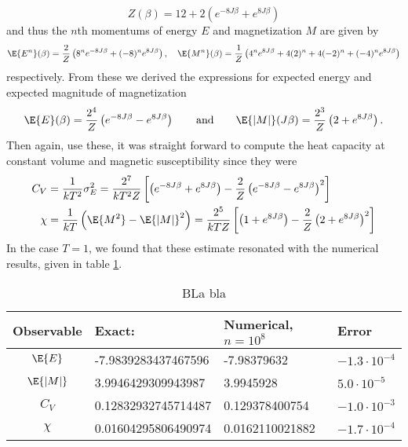 \documentclass[11pt,english,a4paper]{article}
\begin{document}
\[
Z(\beta) = 12 + 2\left( e^{ -8 J\beta} + e^{ 8 J\beta} \right)
\]
and thus the $n$th momentums of energy $E$ and magnetization $M$ are given by
\[
\E{E^n}(\beta) = \frac{2}{Z}\left( 8^n e^{ -8 J\beta} + (-8)^n e^{ 8 J\beta}  \right), \quad \E{M^n}(\beta) = \frac{1}{Z}\left( 4^n e^{ 8 J\beta} + 4(2)^n + 4(-2)^n + (-4)^n e^{ 8 J\beta}  \right)
\]
respectively. From these we derived the expressions for expected energy and expected magnitude of magnetization 
\[
\E{E}(\beta) = \frac{2^4}{Z}\left( e^{ -8 J\beta} - e^{ 8 J\beta}  \right) \qquad \text{and} \qquad \E{|M|}(J\beta) = \frac{2^3}{Z}\left(  2 + e^{ 8 J\beta} \right).
\]
Then again, use these, it was straight forward to compute the heat capacity at constant volume and magnetic susceptibility since they were
\begin{align*}
C_V &= \frac{1}{kT^2}\sigma_E^2 = \frac{2^7}{kT^2Z}\left[  \left( e^{ -8J\beta} + e^{ 8J\beta} \right) - \frac{2}{Z}\left( e^{ -8J\beta} - e^{ 8J\beta} \right)^2  \right] \\
\chi &= \frac{1}{kT} \left(\E{M^2} -\E{|M|}^2 \right) = \frac{2^5}{kTZ} \left[ \left( 1 + e^{ 8J \beta} \right) - \frac{2}{Z}\left( 2 + e^{ 8J \beta} \right)^2 \right]
\end{align*}
In the case $T=1$, we found that these estimate resonated with the numerical results, given in table \ref{tab:errors}.
\begin{table}[!h]
\center
\begin{tabular}{c l l l}
Observable&Exact:					& Numerical, $n = 10^8$& Error\\
\hline
$\E{E}$ & -7.9839283437467596		& -7.98379632& $-1.3\cdot 10^{-4}$\\
$\E{|M|}$ & 3.9946429309943987		& 3.9945928& $5.0\cdot 10^{-5}$\\
$C_V$ & 0.12832932745714487	& 0.129378400754& $-1.0\cdot 10^{-3}$\\
$\chi$ & 0.01604295806490974		& 0.0162110021882& $-1.7\cdot 10^{-4}$
\end{tabular}
\caption{BLa bla} \label{tab:errors}
\end{table}%
\end{document}
